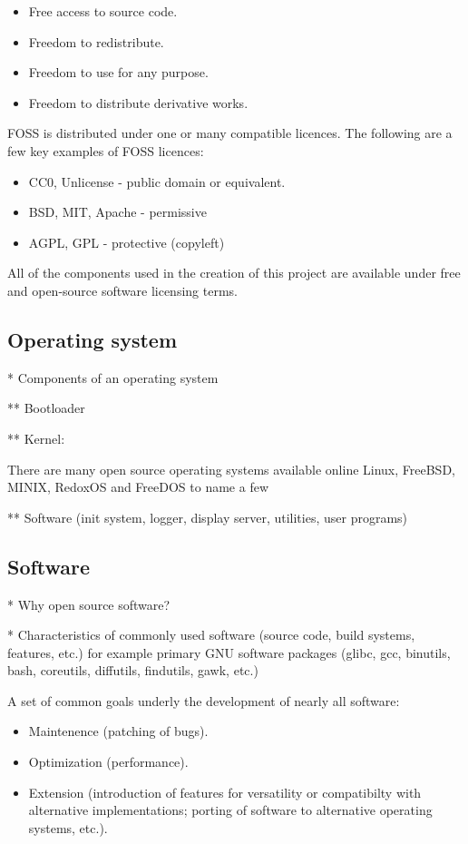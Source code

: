 \begin{itemize}
    \item Free access to source code.
    \item Freedom to redistribute.
    \item Freedom to use for any purpose.
    \item Freedom to distribute derivative works.
\end{itemize}

FOSS is distributed under one or many compatible licences. The following are a few key examples of FOSS licences:

\begin{itemize}
    \item CC0, Unlicense - public domain or equivalent.
    \item BSD, MIT, Apache - permissive
    \item AGPL, GPL - protective (copyleft)
\end{itemize}

All of the components used in the creation of this project are available under free and open-source software licensing terms.

\subsection{Operating system}

* Components of an operating system

** Bootloader

** Kernel:

There are many open source operating systems available online Linux, FreeBSD, MINIX, RedoxOS and FreeDOS to name a few 

** Software (init system, logger, display server, utilities, user programs)

\subsection{Software}

* Why open source software?

* Characteristics of commonly used software (source code, build systems, features, etc.) for example primary GNU software packages (glibc, gcc, binutils, bash, coreutils, diffutils, findutils, gawk, etc.)

A set of common goals underly the development of nearly all software:

\begin{itemize}
    \item Maintenence (patching of bugs).
    \item Optimization (performance).
    \item Extension (introduction of features for versatility or compatibilty with alternative implementations; porting of software to alternative operating systems, etc.).
\end{itemize}

